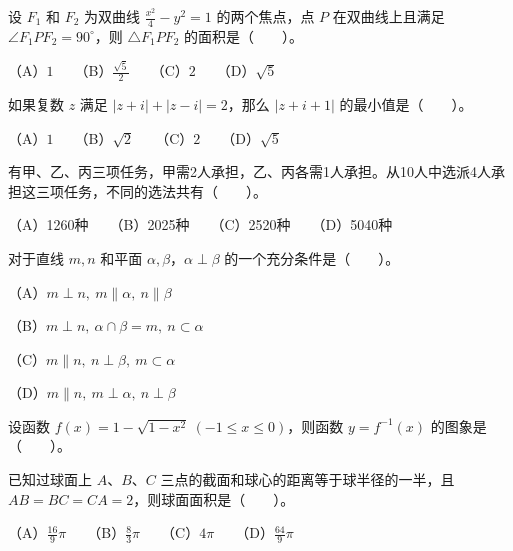 \begin{question}
设 $F_1$ 和 $F_2$ 为双曲线 $\frac{x^2}{4}-y^2=1$ 的两个焦点，点 $P$ 在双曲线上且满足 $\angle F_1PF_2=90^\circ$，则 $\triangle F_1PF_2$ 的面积是\mbox{（　　）}。

（A）$1$　　（B）$\frac{\sqrt5}{2}$　　（C）$2$　　（D）$\sqrt5$

\end{question}
\begin{question}
如果复数 $z$ 满足 $|z+i|+|z-i|=2$，那么 $|z+i+1|$ 的最小值是\mbox{（　　）}。

（A）$1$　　（B）$\sqrt2$　　（C）$2$　　（D）$\sqrt5$

\end{question}
\begin{question}
有甲、乙、丙三项任务，甲需2人承担，乙、丙各需1人承担。从10人中选派4人承担这三项任务，不同的选法共有\mbox{（　　）}。

（A）1260种　　（B）2025种　　（C）2520种　　（D）5040种

\end{question}
\begin{question}
对于直线 $m,n$ 和平面 $\alpha,\beta$，$\alpha\perp\beta$ 的一个充分条件是\mbox{（　　）}。

（A）$m\perp n,\ m\parallel\alpha,\ n\parallel\beta$

（B）$m\perp n,\ \alpha\cap\beta=m,\ n\subset\alpha$

（C）$m\parallel n,\ n\perp\beta,\ m\subset\alpha$

（D）$m\parallel n,\ m\perp\alpha,\ n\perp\beta$

\Needspace{0.4\textheight}
\end{question}
\begin{question}
设函数 $f(x)=1-\sqrt{1-x^2}\ (-1\le x\le0)$，则函数 $y=f^{-1}(x)$ 的图象是\mbox{（　　）}。
\nopagebreak[4]
\begin{center}\end{center}
\nopagebreak[4]
\end{question}
\begin{question}
已知过球面上 $A\text{、}B\text{、}C$ 三点的截面和球心的距离等于球半径的一半，且 $AB=BC=CA=2$，则球面面积是\mbox{（　　）}。

（A）$\frac{16}{9}\pi$　　（B）$\frac83\pi$　　（C）$4\pi$　　（D）$\frac{64}{9}\pi$

\end{question}

